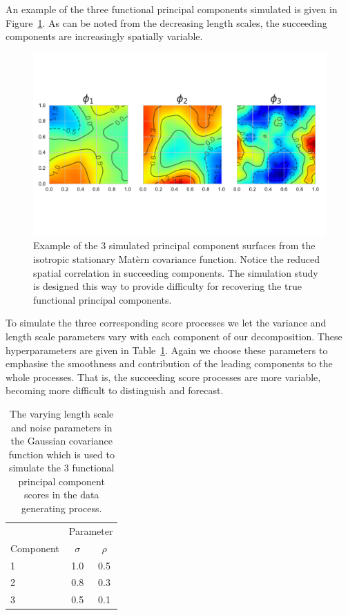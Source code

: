 An example of the three functional principal components simulated is given in Figure~\ref{fig:ftsm_example_fpc}.
As can be noted from the decreasing length scales, the succeeding components are increasingly spatially variable.

\begin{figure}[htbp!] 
	\centering    
	\includegraphics[width=1.0\textwidth]{sim_fpc_example}
	\caption[An example of the simulated functional principle components.]{Example of the 3 simulated principal component surfaces from the isotropic stationary Mat\`{e}rn covariance function. Notice the reduced spatial correlation in succeeding components. The simulation study is designed this way to provide difficulty for recovering the true functional principal components. }
	\label{fig:ftsm_example_fpc}
\end{figure}

To simulate the three corresponding score processes we let the variance and length scale parameters vary with each component of our decomposition.
These hyperparameters are given in Table~\ref{tab:zeta_params}.
Again we choose these parameters to emphasise the smoothness  and contribution of the leading components to the whole processes.
That is, the succeeding score processes are more variable, becoming more difficult to distinguish and forecast. 

\begin{table}[htbp!] 
	\caption[Parameters for simulating functional principal component score processes.]{The varying length scale and noise parameters in the Gaussian covariance function which is used to simulate the $3$ functional principal component scores in the data generating process.}
	\centering
	\label{tab:zeta_params}
	\begin{tabular}{l c c }
		\toprule
		& \multicolumn{2}{c}{Parameter} \\ 
		Component  & $\sigma$ &$\rho$ \\
		\midrule
		1 & 1.0 & 0.5 \\
		2 & 0.8 & 0.3 \\
		3 & 0.5 & 0.1 \\
		\bottomrule
	\end{tabular}
\end{table}

